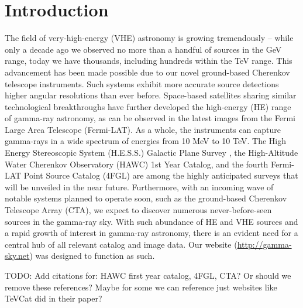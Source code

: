 \section{Introduction}

%
%
%
%


The field of very-high-energy (VHE) astronomy is growing tremendously – while only a decade ago we observed no more than a handful of sources in the GeV range, today we have thousands, including hundreds within the TeV range. This advancement has been made possible due to our novel ground-based Cherenkov telescope instruments. Such systems exhibit more accurate source detections higher angular resolutions than ever before. Space-based satellites sharing similar technological breakthroughs have further developed the high-energy (HE) range of gamma-ray astronomy, as can be observed in the latest images from the Fermi Large Area Telescope (Fermi-LAT). As a whole, the instruments can capture gamma-rays in a wide spectrum of energies from 10 MeV to 10 TeV. The High Energy Stereoscopic System (H.E.S.S.) Galactic Plane Survey \cite{hgps}, the High-Altitude Water Cherenkov Observatory (HAWC) 1st Year Catalog, and the fourth Fermi-LAT Point Source Catalog (4FGL) are among the highly anticipated surveys that will be unveiled in the near future. Furthermore, with an incoming wave of notable systems planned to operate soon, such as the ground-based Cherenkov Telescope Array (CTA), we expect to discover numerous never-before-seen sources in the gamma-ray sky. With such abundance of HE and VHE sources and a rapid growth of interest in gamma-ray astronomy, there is an evident need for a central hub of all relevant catalog and image data. Our website (\url{http://gamma-sky.net}) was designed to function as such.

TODO: Add citations for: HAWC first year catalog, 4FGL, CTA? Or should we remove these references? Maybe for some we can reference just websites like TeVCat did in their paper?
